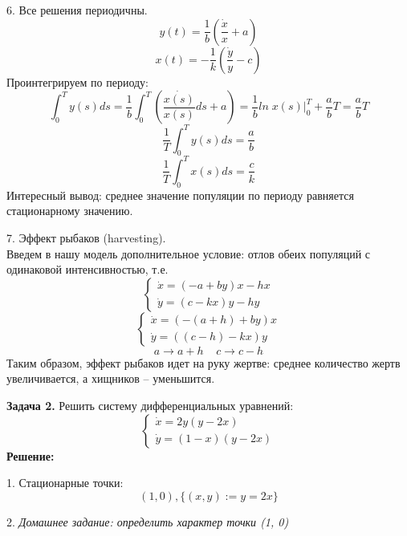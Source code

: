 \documentclass[10pt]{report}
\begin{document}
6. Все решения периодичны. 
\[y(t) = \frac 1 b \left( \frac {\dot{x}} {x} +a\right)\]
\[x(t) = -\frac 1 k \left( \frac {\dot{y}} {y} -c \right)\]
Проинтегрируем по периоду:
\[\int_{0}^{T} y(s) ds= \frac 1 b \int_{0}^{T}\left( \frac {\dot{x(s)}} {x(s)} ds+a\right)= \frac 1 b ln\; x(s) \big|_0^T+\frac a b T= \frac a b T\]
\[\frac 1 T \int_{0}^{T} y(s) ds= \frac a b \]
\[\frac 1 T \int_{0}^{T} x(s) ds= \frac c k \]
Интересный вывод: среднее значение популяции по периоду равняется стационарному значению.

7. Эффект рыбаков (harvesting).\\
Введем в нашу модель дополнительное условие: отлов обеих популяций с одинаковой интенсивностью, т.е.
\begin{equation}
\left\{
\begin{array}{lr}
\dot{x}=(-a+by)x-hx\\
\dot{y}=(c-kx)y-hy
\end{array}
\right.
\end{equation}
\[
\left\{
\begin{array}{lr}
\dot{x}=(-(a+h)+by)x\\
\dot{y}=((c-h)-kx)y
\end{array}
\right.\]
\[ a \rightarrow a+h \;\;\;\; c \rightarrow c-h\]
Таким образом, эффект рыбаков идет на руку жертве: среднее количество жертв увеличивается, а хищников -- уменьшится.

\textbf{Задача 2.} Решить систему дифференциальных уравнений:
\begin{equation}
\left\{
\begin{array}{lr}
\dot{x}=2y(y-2x)\\
\dot{y}=(1-x)(y-2x)
\end{array}
\right.
\end{equation}
\textbf{Решение:}

1. Стационарные точки:
\[ (1, 0), \{(x,y):= y=2x\}\]

2. \textit{Домашнее задание: определить характер точки (1, 0)}
\end{document}
